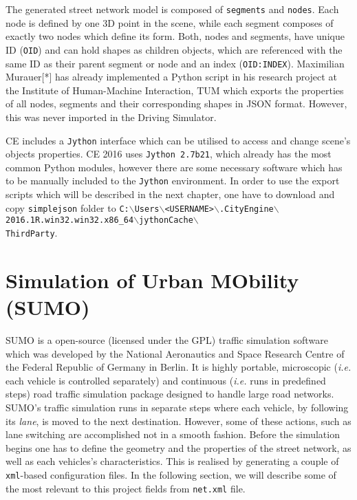 The generated street network model is composed of \texttt{segments} and \texttt{nodes}. Each node is defined by one 3D point in the scene, while each segment composes of exactly two nodes which define its form. Both, nodes and segments, have unique ID (\texttt{OID}) and can hold shapes as children objects, which are referenced with the same ID as their parent segment or node and an index (\texttt{OID:INDEX}). Maximilian Murauer[*] has already implemented a Python script in his research project at the Institute of Human-Machine Interaction, TUM which exports the properties of all nodes, segments and their corresponding shapes in JSON format. However, this was never imported in the Driving Simulator.

CE includes a \texttt{Jython} interface which can be utilised to access and change scene's objects properties. CE 2016 uses \texttt{Jython 2.7b21}, which already has the most common Python modules, however there are some necessary software which has to be manually included to the \texttt{Jython} environment. In order to use the export scripts which will be described in the next chapter, one have to download and copy \texttt{simplejson} folder to \texttt{C:$\backslash$Users$\backslash$<USERNAME>$\backslash$.CityEngine$\backslash$2016.1R.win32.win32.x86\_64$\backslash$jythonCache$\backslash$\\ThirdParty}.

\section{Simulation of Urban MObility (SUMO)}
\label{ch:sumo}
SUMO is a open-source (licensed under the GPL) traffic simulation software which was developed by the National Aeronautics and Space Research Centre of the Federal Republic of Germany in Berlin. It is highly portable, microscopic (\emph{i.e.} each vehicle is controlled separately) and continuous (\emph{i.e.} runs in predefined steps) road traffic simulation package designed to handle large road networks. SUMO's traffic simulation runs in separate steps where each vehicle, by following its \emph{lane}, is moved to the next destination. However, some of these actions, such as lane switching are accomplished not in a smooth fashion. Before the simulation begins one has to define the geometry and the properties of the street network, as well as each vehicles's characteristics. This is realised by generating a couple of \texttt{xml}-based configuration files. In the following section, we will describe some of the most relevant to this project fields from \texttt{net.xml} file.

